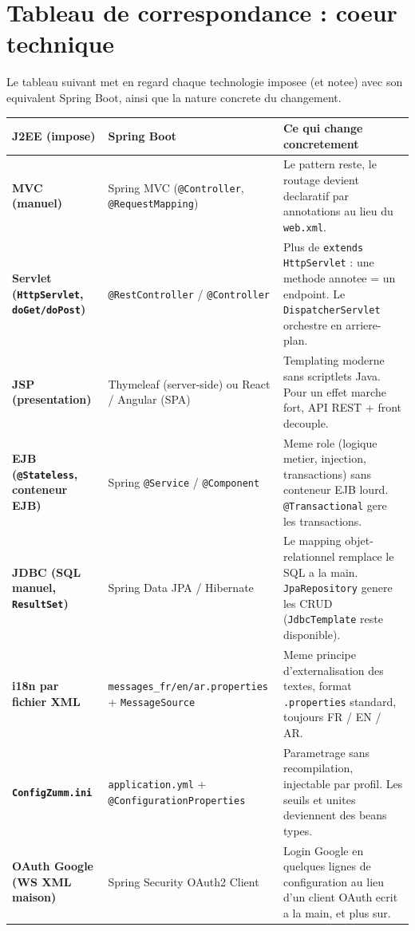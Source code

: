 \section{Tableau de correspondance : coeur technique}
Le tableau suivant met en regard chaque technologie imposee (et notee) avec son
equivalent Spring Boot, ainsi que la nature concrete du changement.

\begin{xltabular}{\textwidth}{>{\bfseries}p{3cm} p{3.4cm} X}
\toprule
\textbf{J2EE (impose)} & \textbf{Spring Boot} & \textbf{Ce qui change concretement} \\
\midrule
\endhead
MVC (manuel) & Spring MVC (\texttt{@Controller}, \texttt{@RequestMapping}) & Le pattern reste, le routage devient declaratif par annotations au lieu du \texttt{web.xml}. \\
Servlet (\texttt{HttpServlet}, \texttt{doGet/doPost}) & \texttt{@RestController} / \texttt{@Controller} & Plus de \texttt{extends HttpServlet} : une methode annotee = un endpoint. Le \texttt{DispatcherServlet} orchestre en arriere-plan. \\
JSP (presentation) & Thymeleaf (server-side) ou React / Angular (SPA) & Templating moderne sans scriptlets Java. Pour un effet marche fort, API REST + front decouple. \\
EJB (\texttt{@Stateless}, conteneur EJB) & Spring \texttt{@Service} / \texttt{@Component} & Meme role (logique metier, injection, transactions) sans conteneur EJB lourd. \texttt{@Transactional} gere les transactions. \\
JDBC (SQL manuel, \texttt{ResultSet}) & Spring Data JPA / Hibernate & Le mapping objet-relationnel remplace le SQL a la main. \texttt{JpaRepository} genere les CRUD (\texttt{JdbcTemplate} reste disponible). \\
i18n par fichier XML & \texttt{messages\_fr/\allowbreak en/\allowbreak ar\allowbreak .properties} + \texttt{MessageSource} & Meme principe d'externalisation des textes, format \texttt{.properties} standard, toujours FR / EN / AR. \\
\texttt{ConfigZumm.ini} & \texttt{application.yml} + \texttt{@Configuration\allowbreak Properties} & Parametrage sans recompilation, injectable par profil. Les seuils et unites deviennent des beans types. \\
OAuth Google (WS XML maison) & Spring Security OAuth2 Client & Login Google en quelques lignes de configuration au lieu d'un client OAuth ecrit a la main, et plus sur. \\

\end{xltabular}
